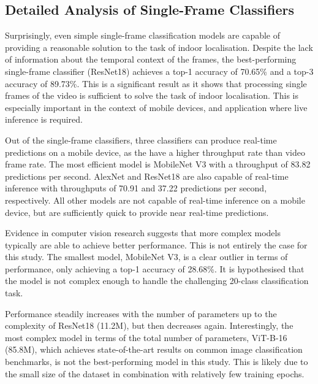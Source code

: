 \documentclass[a4paper]{article}
\begin{document}
  \subsection{Detailed Analysis of Single-Frame Classifiers} %
  \label{sub:analysis-single-frame-classifiers}

  Surprisingly, even simple single-frame classification models are capable of
  providing a reasonable solution to the task of indoor localisation. Despite
  the lack of information about the temporal context of the frames, the
  best-performing single-frame classifier (ResNet18) achieves a top-1 accuracy
  of 70.65\% and a top-3 accuracy of 89.73\%. This is a significant result as it
  shows that processing single frames of the video is sufficient to solve the
  task of indoor localisation. This is especially important in the context of
  mobile devices, and application where live inference is required.

  Out of the single-frame classifiers, three classifiers can produce real-time
  predictions on a mobile device, as the have a higher throughput rate than
  video frame rate. The most efficient model is MobileNet V3 with a throughput of
  83.82 predictions per second. AlexNet and ResNet18 are also capable of
  real-time inference with throughputs of 70.91 and 37.22 predictions per
  second, respectively. All other models are not capable of real-time inference
  on a mobile device, but are sufficiently quick to provide near real-time
  predictions.

  Evidence in computer vision research suggests that more complex models
  typically are able to achieve better performance. This is not entirely the
  case for this study. The smallest model, MobileNet V3, is a clear outlier in
  terms of performance, only achieving a top-1 accuracy of 28.68\%. It is
  hypothesised that the model is not complex enough to handle the challenging
  20-class classification task.

  Performance steadily increases with the number of parameters up to the
  complexity of ResNet18 (11.2M), but then decreases again. Interestingly, the
  most complex model in terms of the total number of parameters, ViT-B-16
  (85.8M), which achieves state-of-the-art results on common image
  classification benchmarks, is not the best-performing model in this study.
  This is likely due to the small size of the dataset in combination with
  relatively few training epochs. 
\end{document}
